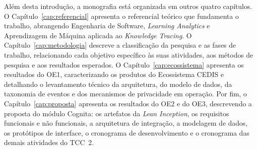 Além desta introdução, a monografia está organizada em outros quatro capítulos. O Capítulo~\ref{cap:referencial} apresenta o referencial teórico que fundamenta o trabalho, abrangendo Engenharia de Software, \textit{Learning Analytics} e Aprendizagem de Máquina aplicada ao \textit{Knowledge Tracing}. O Capítulo~\ref{cap:metodologia} descreve a classificação da pesquisa e as fases de trabalho, relacionando cada objetivo específico às suas atividades, aos métodos de pesquisa e aos resultados esperados. O Capítulo~\ref{cap:ecossistema} apresenta os resultados do OE1, caracterizando os produtos do Ecossistema CEDIS e detalhando o levantamento técnico da arquitetura, do modelo de dados, da taxonomia de eventos e dos mecanismos de privacidade em operação. Por fim, o Capítulo~\ref{cap:proposta} apresenta os resultados do OE2 e do OE3, descrevendo a proposta do módulo Cognita: os artefatos da \textit{Lean Inception}, os requisitos funcionais e não funcionais, a arquitetura de integração, a modelagem de dados, os protótipos de interface, o cronograma de desenvolvimento e o cronograma das demais atividades do TCC~2.
